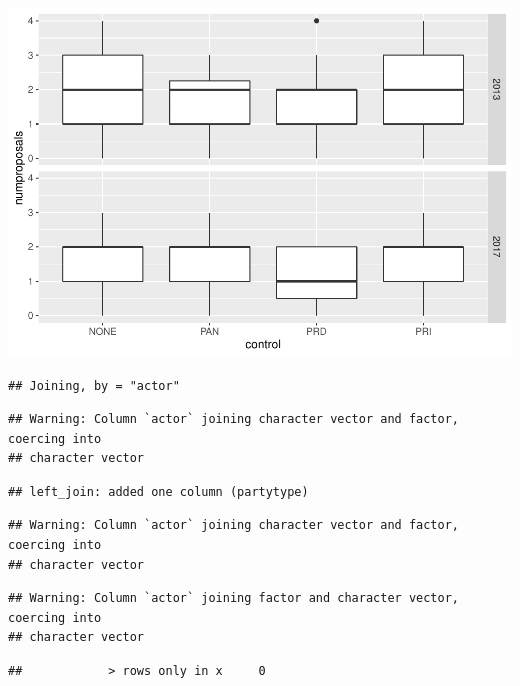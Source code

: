 \documentclass[
]{article}
\newenvironment{Shaded}{\begin{snugshade}}{\end{snugshade}}
\newcommand{\CommentTok}[1]{\textcolor[rgb]{0.56,0.35,0.01}{\textit{#1}}}
\newcommand{\KeywordTok}[1]{\textcolor[rgb]{0.13,0.29,0.53}{\textbf{#1}}}
\newcommand{\NormalTok}[1]{#1}
\newcommand{\OperatorTok}[1]{\textcolor[rgb]{0.81,0.36,0.00}{\textbf{#1}}}
\newcommand{\StringTok}[1]{\textcolor[rgb]{0.31,0.60,0.02}{#1}}
\begin{document}
\includegraphics{ProposalAnalysis_files/figure-latex/unnamed-chunk-6-1.pdf}

\begin{Shaded}
\end{Shaded}

\begin{verbatim}
## Joining, by = "actor"
\end{verbatim}

\begin{verbatim}
## Warning: Column `actor` joining character vector and factor, coercing into
## character vector
\end{verbatim}

\begin{verbatim}
## left_join: added one column (partytype)
\end{verbatim}

\begin{verbatim}
## Warning: Column `actor` joining character vector and factor, coercing into
## character vector
\end{verbatim}

\begin{verbatim}
## Warning: Column `actor` joining factor and character vector, coercing into
## character vector
\end{verbatim}

\begin{verbatim}
##            > rows only in x     0
\end{verbatim}
\end{document}
